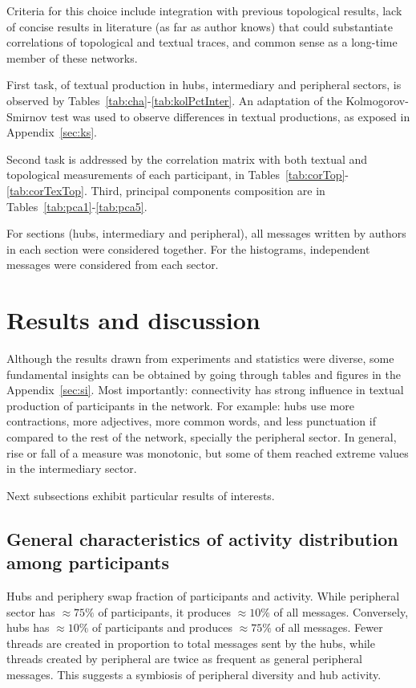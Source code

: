 \documentclass[%
 aip,
 jmp,%
 amsmath,amssymb,
 reprint,%
]{revtex4-1}
\begin{document}
Criteria for this choice include integration with previous topological results, lack of concise results in literature (as far as author knows) that
could substantiate correlations of topological and textual traces, and common sense as a long-time member of these networks.

First task, of textual production in hubs, intermediary and peripheral sectors, is observed by Tables~\ref{tab:cha}-\ref{tab:kolPctInter}. An adaptation of the Kolmogorov-Smirnov test was used to observe differences in textual productions, as exposed in Appendix~\ref{sec:ks}.

Second task is addressed by the correlation matrix with both textual and topological measurements of each participant, in Tables~\ref{tab:corTop}-\ref{tab:corTexTop}. Third, principal components composition are in Tables~\ref{tab:pca1}-\ref{tab:pca5}. 

For sections (hubs, intermediary and peripheral),
all messages written by authors in each section were considered together. For the histograms, independent messages were considered from each sector. 

\section{Results and discussion}\label{sec:results}

Although the results drawn from experiments and statistics were diverse, some fundamental insights can be obtained by going through tables and figures in the Appendix~\ref{sec:si}. Most importantly: connectivity has strong influence in textual production of participants in the network. For example: hubs use more contractions, more adjectives, more common words, and less punctuation if compared to the rest of the network, specially the peripheral sector. In general, rise or fall of a measure was monotonic, but some of them reached extreme values in the intermediary sector.

Next subsections exhibit particular results of interests.

\subsection{General characteristics of activity distribution among participants}\label{sec:gen}
Hubs and periphery swap fraction of participants and activity. While peripheral sector has $\approx 75\%$ of participants, it produces $\approx 10\%$ of all messages. Conversely, hubs has $\approx 10\%$ of participants and produces $\approx 75\%$ of all messages. Fewer threads are created in proportion to total messages sent by the hubs, while threads created by peripheral are twice as frequent as general peripheral messages.
This suggests a symbiosis of peripheral diversity and hub activity. 
\end{document}

